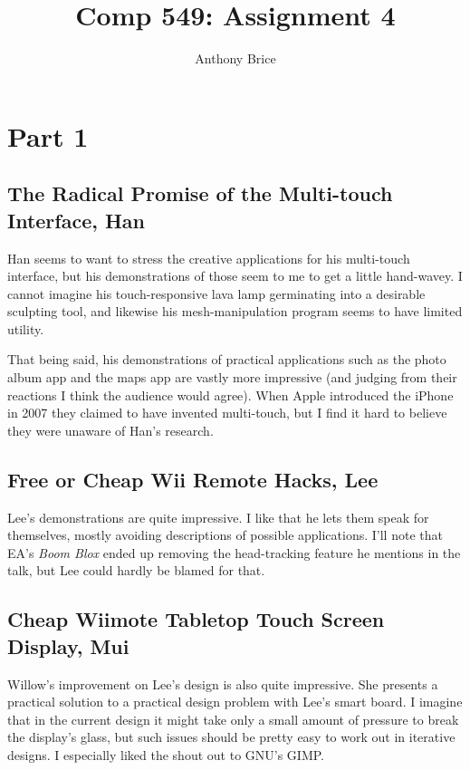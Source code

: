 \documentclass{abrice}
\title{Comp 549: Assignment 4}
\author{Anthony Brice}
\begin{document}
\maketitle

\section{Part 1}

\subsection{The Radical Promise of the Multi-touch Interface, Han}

Han seems to want to stress the creative applications for his multi-touch
interface, but his demonstrations of those seem to me to get a little
hand-wavey. I cannot imagine his touch-responsive lava lamp germinating into a
desirable sculpting tool, and likewise his mesh-manipulation program seems to
have limited utility.

That being said, his demonstrations of practical applications such as the photo
album app and the maps app are vastly more impressive (and judging from their
reactions I think the audience would agree). When Apple introduced the iPhone in
2007 they claimed to have invented multi-touch, but I find it hard to believe
they were unaware of Han's research.

\subsection{Free or Cheap Wii Remote Hacks, Lee}

Lee's demonstrations are quite impressive. I like that he lets them speak for
themselves, mostly avoiding descriptions of possible applications. I'll note
that EA's \emph{Boom Blox} ended up removing the head-tracking feature he
mentions in the talk, but Lee could hardly be blamed for that.

\subsection{Cheap Wiimote Tabletop Touch Screen Display, Mui}

Willow's improvement on Lee's design is also quite impressive. She presents a
practical solution to a practical design problem with Lee's smart board. I
imagine that in the current design it might take only a small amount of pressure
to break the display's glass, but such issues should be pretty easy to work out
in iterative designs. I especially liked the shout out to GNU's GIMP.
\end{document}

